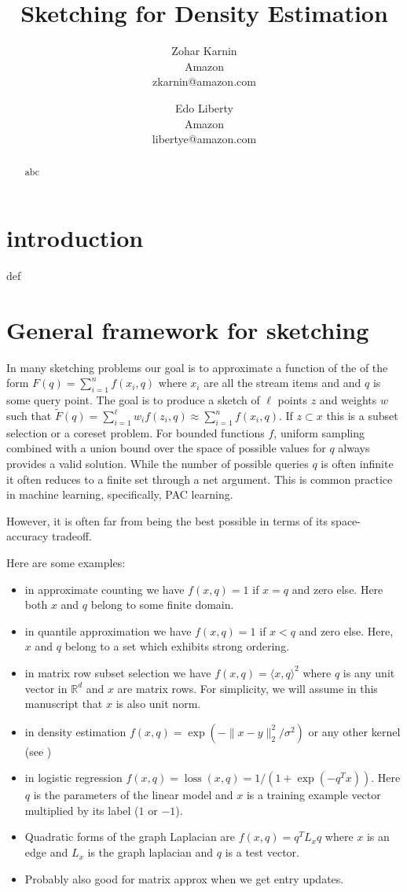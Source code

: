 \documentclass{article} %
\title{Sketching for Density Estimation}
\date{\nonumber}
\author{
Zohar Karnin\\Amazon\\zkarnin@amazon.com
\and
Edo Liberty\\Amazon\\libertye@amazon.com
}
\newcommand{\R}{\mathbb{R}}
\begin{document}
\maketitle

\begin{abstract}
abc
\end{abstract}

\section{introduction}
def

\section{General framework for sketching}
In many sketching problems our goal is to approximate a function of the of the form $F(q) = \sum_{i=1}^{n} f(x_i, q)$ where $x_i$ are all the stream items and and $q$ is some query point. 
The goal is to produce a sketch of $\ell$ points $z$ and weights $w$ such that $\tilde F(q) = \sum_{i=1}^{\ell}w_i f(z_i,q) \approx \sum_{i=1}^{n} f(x_i, q)$. 
If $z \subset x$ this is a subset selection or a coreset problem. 
For bounded functions $f$, uniform sampling combined with a union bound over the space of possible values for $q$ always provides a valid solution. 
While the number of possible queries $q$ is often infinite it often reduces to a finite set through a net argument. 
This is common practice in machine learning, specifically, PAC learning. 

However, it is often far from being the best possible in terms of its space-accuracy tradeoff. 

Here are some examples:
\begin{itemize}
\item in approximate counting we have $f(x, q) = 1$ if $x=q$ and zero else. Here both $x$ and $q$ belong to some finite domain.
\item in quantile approximation we have $f(x, q) = 1$ if $x<q$ and zero else. Here, $x$ and $q$ belong to a set which exhibits strong ordering.
\item in matrix row subset selection we have $f(x, q) = \langle x,q \rangle ^2$ where $q$ is any unit vector in $\R^d$ and $x$ are matrix rows. For simplicity, we will assume in this manuscript that $x$ is also unit norm.
\item in density estimation $f(x, q) = \exp(- \|x-y\|_2^2/\sigma^2)$ or any other kernel (see \cite{})
\item in logistic regression $f(x, q) = \operatorname{loss}(x,q) = 1/(1 + \exp(-q^T x))$. 
Here $q$ is the parameters of the linear model and $x$ is a training example vector multiplied by its label ($1$ or $-1$).
\item Quadratic forms of the graph Laplacian are $f(x, q) = q^T L_x q$ where $x$ is an edge and $L_x$ is the graph laplacian and $q$ is a test vector.
\item Probably also good for matrix approx when we get entry updates. 
\end{itemize}
\end{document}
